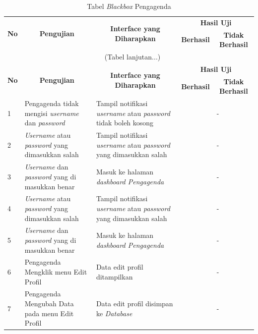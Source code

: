 \begin{enumerate}
{		\begin{longtable}{p{0.5cm} p{4cm} p{4cm} p{0.5cm} p{1cm}}
			\caption{Tabel \textit{Blackbox} Pengagenda}
			\label{blackboxtesting3}\\ 
			\hline
			\multicolumn{1}{c}{\multirow{2}{*}{\textbf{No}}} & \multicolumn{1}{c}{\multirow{2}{*}{\textbf{Pengujian}}} & \multicolumn{1}{c}{\multirow{2}{*}{\textbf{Interface yang Diharapkan}}} & \multicolumn{2}{c}{\textbf{Hasil Uji}} \\ \cline{4-5} 
			\multicolumn{1}{c}{} & \multicolumn{1}{c}{} & \multicolumn{1}{c}{} & \multicolumn{1}{c}{\textbf{Berhasil}} & \multicolumn{1}{c}{\textbf{Tidak Berhasil}} \\ \hline
			\endfirsthead
			\multicolumn{5}{c}{\tablename\ \thetable\ \namaTabel \space (Tabel
				lanjutan...)} \\
			\hline
			\multicolumn{1}{c}{\multirow{2}{*}{\textbf{No}}} & \multicolumn{1}{c}{\multirow{2}{*}{\textbf{Pengujian}}} & \multicolumn{1}{c}{\multirow{2}{*}{\textbf{Interface yang Diharapkan}}} & \multicolumn{2}{c}{\textbf{Hasil Uji}} \\ \cline{4-5} 
			\multicolumn{1}{c}{} & \multicolumn{1}{c}{} & \multicolumn{1}{c}{} & \multicolumn{1}{c}{\textbf{Berhasil}} & \multicolumn{1}{c}{\textbf{Tidak Berhasil}} \\ \hline
			\endhead
			1 & Pengagenda tidak mengisi \textit{username} dan \textit{password} & Tampil notifikasi \textit{username} atau \textit{password} tidak boleh kosong & \checkmark & -\\
			2 & \textit{Username} atau \textit{password} yang dimasukkan salah & Tampil notifikasi \textit{username} atau \textit{password} yang dimasukkan salah & \checkmark & -\\
			3 & \textit{Username} dan \textit{password} yang di masukkan benar & Masuk ke halaman \textit{dashboard Pengagenda} & \checkmark & -\\
			4 & \textit{Username} atau \textit{password} yang dimasukkan salah & Tampil notifikasi \textit{username} atau \textit{password} yang dimasukkan salah & \checkmark & -\\
			5 & \textit{Username} dan \textit{password} yang di masukkan benar & Masuk ke halaman \textit{dashboard Pengagenda} & \checkmark & -\\
			6 & Pengagenda Mengklik menu Edit Profil  & Data edit profil ditampilkan & \checkmark & -\\
			7 & Pengagenda Mengubah Data pada  menu Edit Profil  & Data edit profil disimpan ke \textit{Database} & \checkmark & -\\

\end{longtable}}
\end{enumerate}
